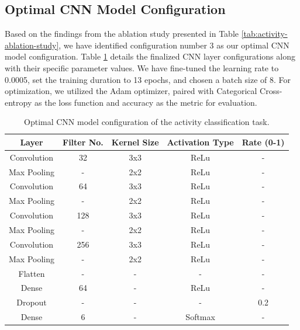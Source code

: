 \documentclass{l4proj}
\begin{document}
\subsection{Optimal CNN Model Configuration}
Based on the findings from the ablation study presented in Table \ref{tab:activity-ablation-study}, we have identified configuration number 3 as our optimal CNN model configuration. Table \ref{tab:activity-final-CNN-configuration} details the finalized CNN layer configurations along with their specific parameter values. We have fine-tuned the learning rate to 0.0005, set the training duration to 13 epochs, and chosen a batch size of 8. For optimization, we utilized the Adam optimizer, paired with Categorical Cross-entropy as the loss function and accuracy as the metric for evaluation.

\begin{table}[ht]
    \centering
    \begin{tabular}{ccccc}
        \toprule
        \textbf{Layer} & \textbf{Filter No.} & \textbf{Kernel Size} & \textbf{Activation Type} & \textbf{Rate (0-1)} \\
        \midrule
        \midrule
        Convolution & 32  & 3x3 & ReLu & - \\
        Max Pooling & - & 2x2 & ReLu & - \\
        Convolution & 64 & 3x3 & ReLu & - \\
        Max Pooling & - & 2x2 & ReLu & - \\
        Convolution & 128 & 3x3 & ReLu & - \\
        Max Pooling & - & 2x2 & ReLu & - \\
        Convolution & 256 & 3x3 & ReLu & - \\
        Max Pooling & - & 2x2 & ReLu & - \\
        Flatten & - & - & - & - \\
        Dense & 64 & - & ReLu & - \\
        Dropout & - & - & - & 0.2 \\
        Dense & 6 & - & Softmax  & - \\
        \bottomrule
    \end{tabular}
    \caption{Optimal CNN model configuration of the activity classification task.}
    \label{tab:activity-final-CNN-configuration}
\end{table}
\end{document}
